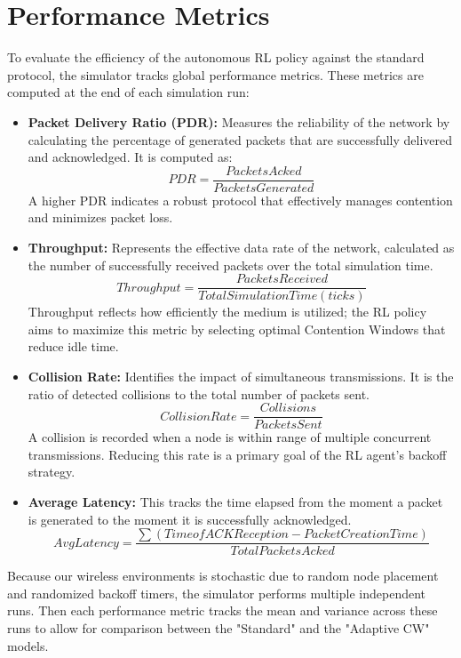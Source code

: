 \section{Performance Metrics}
To evaluate the efficiency of the autonomous RL policy against the standard protocol, the simulator tracks global performance metrics. 
These metrics are computed at the end of each simulation run:
\begin{itemize}
    \item \textbf{Packet Delivery Ratio (PDR):} Measures the reliability of the network by calculating the percentage of generated packets that are successfully delivered and acknowledged. It is computed as:
    \begin{equation*}
        PDR=\frac{Packets Acked} {Packets Generated}
    \end{equation*}
    A higher PDR indicates a robust protocol that effectively manages contention and minimizes packet loss.
    
    \item \textbf{Throughput:} Represents the effective data rate of the network, calculated as the number of successfully received packets over the total simulation time.
    \begin{equation*}
        Throughput=\frac{Packets Received}{Total Simulation Time (ticks)}
    \end{equation*}
    Throughput reflects how efficiently the medium is utilized; the RL policy aims to maximize this metric by selecting optimal Contention Windows that reduce idle time.
    
    \item \textbf{Collision Rate:} Identifies the impact of simultaneous transmissions. It is the ratio of detected collisions to the total number of packets sent.
    \begin{equation*}
        Collision Rate=\frac{Collisions}{Packets Sent}
    \end{equation*}
    A collision is recorded when a node is within range of multiple concurrent transmissions. Reducing this rate is a primary goal of the RL agent's backoff strategy.
    
    \item \textbf{Average Latency:} This tracks the time elapsed from the moment a packet is generated to the moment it is successfully acknowledged.
    \begin{equation*}
        Avg Latency=\frac{\sum(Time of ACK Reception-Packet Creation Time)}{Total Packets Acked}   
    \end{equation*}
\end{itemize}

Because our wireless environments is stochastic due to random node placement and randomized backoff timers, the simulator performs multiple independent runs. Then each performance metric tracks the mean and variance across these runs to allow for comparison between the "Standard" and the "Adaptive CW" models.